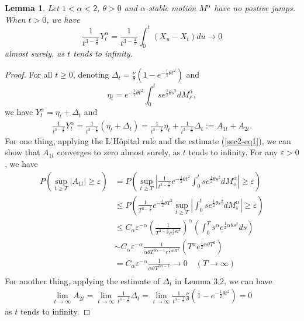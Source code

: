 \documentclass[11pt]{amsart}
\theoremstyle{plain}
\newtheorem{lemma}{Lemma}[section]
\numberwithin{equation}{section}
\begin{document}
\begin{lemma}
Let $1<\alpha<2$, $\theta>0$ and $\alpha$-stable motion $M^\alpha$ have no postive jumps. When $t>0$, we have
\begin{equation}\label{sec3-eq16}
\frac{1}{t^{3-\frac{2}{\alpha}}}Y_t^\alpha =\frac{1}{t^{3-\frac{2}{\alpha}}} \int_0^t (X_u-X_t)du\longrightarrow 0
\end{equation}
almost surely, as $t$ tends to infinity.
\end{lemma}
\begin{proof}
For all $t\geq 0$, denoting $\Delta_t=\frac{\nu}{\theta}\left(1-e^{-\frac{1}{2}\theta t^2}\right)$ and
$$
\eta_t=e^{-\frac{1}{2}\theta t^2}\int_0^t se^{\frac{1}{2}\theta s^2}dM_s^\alpha,
$$
we have $Y_t^\alpha=\eta_t+\Delta_t$ and
\begin{equation*}
\begin{aligned}
\frac{1}{t^{3-\frac{2}{\alpha}}}Y_t^\alpha=\frac{1}{t^{3-\frac{2}{\alpha}}}(\eta_t+\Delta_t)=\frac{1}{t^{3-\frac{2}{\alpha}}}\eta_t+\frac{1}{t^{3-\frac{2}{\alpha}}}\Delta_t:=A_{1t}+A_{2t}.
\end{aligned}
\end{equation*}
For one thing, applying the L'H\^{o}pital rule and the estimate (\ref{sec2-eq1}), we can show that $A_{1t}$ converges to zero almost surely, as $t$ tends to infinity. For any $\varepsilon>0$, we have 
\begin{equation*}
\begin{aligned}
P\left(\sup_{t\geq T}\left|A_{1t}\right|\geq \varepsilon\right)&=P\left(\sup_{t\geq T}\left|\frac{1}{t^{3-\frac{2}{\alpha}}}e^{-\frac{1}{2}\theta t^2}\int_0^tse^{\frac{1}{2}\theta s^2}dM_s^\alpha\right|\geq \varepsilon\right)\\
&\leq P\left(\frac{1}{T^{3-\frac{2}{\alpha}}}e^{-\frac{1}{2}\theta T^2}\sup_{t\geq T}\left|\int_0^t se^{\frac{1}{2}\theta s^2}dM_s^\alpha\right|\geq \varepsilon\right)\\
&\leq C_\alpha \varepsilon^{-\alpha}\left(\frac{1}{T^{3-\frac{2}{\alpha}}e^{\frac{1}{2}\theta T^2}}\right)^\alpha\left(\int_0^T s^\alpha e^{\frac{1}{2}\alpha\theta s^2}ds\right)\\
&\sim C_\alpha\varepsilon^{-\alpha}\frac{1}{\alpha\theta T^{3\alpha-1}e^{\frac{1}{2}\alpha\theta T^2}}\left(T^\alpha e^{\frac{1}{2}\alpha\theta T^2}\right)\\
&=C_\alpha\varepsilon^{-\alpha}\frac{1}{\alpha\theta T^{2\alpha-1}}\longrightarrow0\quad(T\rightarrow\infty)\\
\end{aligned}
\end{equation*}
For another thing, applying the estimate of $\Delta_t$ in Lemma 3.2, we can have 
\begin{equation*}
\begin{aligned}
\lim_{t\rightarrow \infty}A_{2t}=\lim_{t\rightarrow \infty}\frac{1}{t^{3-\frac{2}{\alpha}}}\Delta_t=\lim_{t\rightarrow\infty}\frac{1}{t^{3-\frac{2}{\alpha}}}\frac{\nu}{\theta}\left(1-e^{-\frac{1}{2}\theta t^2}\right)=0
\end{aligned}
\end{equation*}
as $t$ tends to infinity. 


\end{proof}
\end{document}
